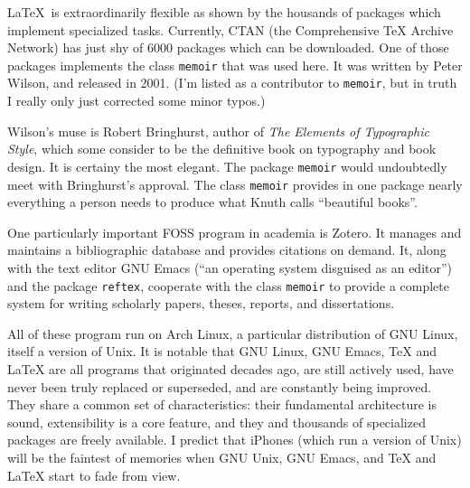 LaTeX is extraordinarily flexible as shown by the housands of packages which implement specialized tasks. Currently, CTAN (the Comprehensive TeX Archive Network) has just shy of 6000 packages which can be downloaded. One of those packages implements the class \texttt{memoir} that was used here. It was written by Peter Wilson, and released in 2001. (I'm listed as a contributor to \texttt{memoir}, but in truth I really only just corrected some minor typos.)
\newpage
\begin{center}
  \textbf{\quad\quad{}\quad\quad{}\quad\quad{}\quad\quad{}}
\end{center}
Wilson's muse is Robert Bringhurst, author of \textit{The Elements of Typographic Style}, which some consider to be the definitive book on typography and book design. It is certainy the most elegant. The package \texttt{memoir} would undoubtedly meet with Bringhurst's approval.  The class \texttt{memoir} provides in one package nearly everything a person needs to produce what Knuth calls ``beautiful books''.
\begin{center}
  \textbf{\quad\quad{}\quad\quad{}\quad\quad{}\quad\quad{}}
\end{center}
One particularly important FOSS program in academia is Zotero. It manages and maintains a bibliographic database and provides citations on demand. It, along with the text editor GNU Emacs (``an operating system disguised as an editor'') and the package \texttt{reftex}, cooperate with the class \texttt{memoir} to provide a complete system for writing scholarly papers, theses, reports, and dissertations.
\begin{center}
  \textbf{\quad\quad{}\quad\quad{}\quad\quad{}\quad\quad{}}
\end{center}
All of these program run on Arch Linux, a particular distribution of GNU Linux, itself a version of Unix. It is notable that GNU Linux, GNU Emacs, \TeX{} and \LaTeX{} are all programs that originated decades ago, are still actively used, have never been truly replaced or superseded, and are constantly being improved. They share a common set of characteristics: their fundamental architecture is sound, extensibility is a core feature, and they and thousands of specialized packages are freely available. I predict that iPhones (which run a version of Unix) will be the faintest of memories when GNU Unix, GNU Emacs, and \TeX{} and \LaTeX{} start to fade from view.

